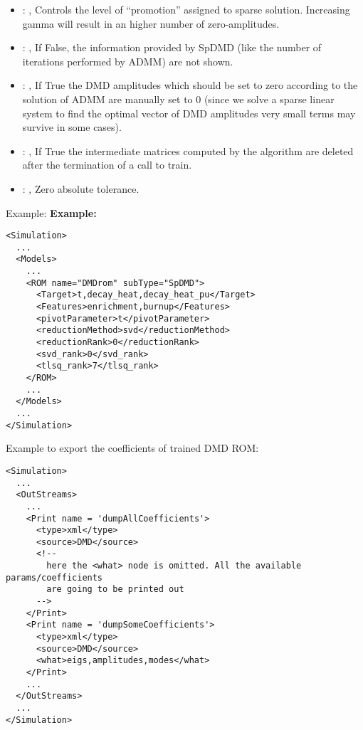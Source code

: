 \begin{itemize}
    \item {}: , 
      Controls the level of “promotion” assigned to sparse solution. Increasing gamma will
      result in an higher number of zero-amplitudes.

    \item {}: , 
      If False, the information provided by SpDMD (like the number of iterations performed
      by ADMM) are not shown.

    \item {}: , 
      If True the DMD amplitudes which should be set to zero
      according to the solution of ADMM are manually set to 0 (since we
      solve a sparse linear system to find the optimal vector of DMD amplitudes
      very small terms may survive in some cases).

    \item {}: , 
      If True the intermediate matrices computed by the algorithm are deleted
      after the termination of a call to train.

    \item {}: , 
      Zero absolute tolerance.
  \end{itemize}

\hspace{24pt}
Example:
\textbf{Example:}
\begin{lstlisting}[style=XML,morekeywords={name,subType}]
<Simulation>
  ...
  <Models>
    ...
    <ROM name="DMDrom" subType="SpDMD">
      <Target>t,decay_heat,decay_heat_pu</Target>
      <Features>enrichment,burnup</Features>
      <pivotParameter>t</pivotParameter>
      <reductionMethod>svd</reductionMethod>
      <reductionRank>0</reductionRank>
      <svd_rank>0</svd_rank>
      <tlsq_rank>7</tlsq_rank>
    </ROM>
    ...
  </Models>
  ...
</Simulation>
\end{lstlisting}

Example to export the coefficients of trained DMD ROM:
\begin{lstlisting}[style=XML,morekeywords={name,subType}]
<Simulation>
  ...
  <OutStreams>
    ...
    <Print name = 'dumpAllCoefficients'>
      <type>xml</type>
      <source>DMD</source>
      <!--
        here the <what> node is omitted. All the available params/coefficients
        are going to be printed out
      -->
    </Print>
    <Print name = 'dumpSomeCoefficients'>
      <type>xml</type>
      <source>DMD</source>
      <what>eigs,amplitudes,modes</what>
    </Print>
    ...
  </OutStreams>
  ...
</Simulation>
\end{lstlisting}


